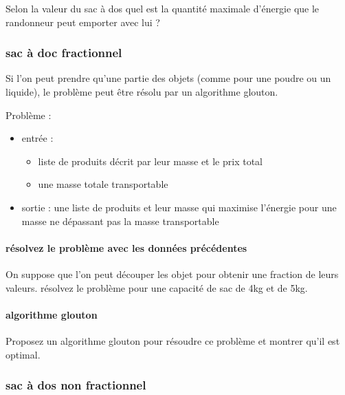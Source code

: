 \documentclass[
]{article}
\providecommand{\tightlist}{%
  \setlength{\itemsep}{0pt}\setlength{\parskip}{0pt}}
\begin{document}
Selon la valeur du sac à dos quel est la quantité maximale d'énergie que
le randonneur peut emporter avec lui ?

\hypertarget{sac-uxe0-doc-fractionnel}{%
\subsubsection{sac à doc fractionnel}\label{sac-uxe0-doc-fractionnel}}

Si l'on peut prendre qu'une partie des objets (comme pour une poudre ou
un liquide), le problème peut être résolu par un algorithme glouton.

Problème :

\begin{itemize}
\tightlist
\item
  entrée :

  \begin{itemize}
  \tightlist
  \item
    liste de produits décrit par leur masse et le prix total
  \item
    une masse totale transportable
  \end{itemize}
\item
  sortie : une liste de produits et leur masse qui maximise l'énergie
  pour une masse ne dépassant pas la masse transportable
\end{itemize}

\hypertarget{ruxe9solvez-le-probluxe8me-avec-les-donnuxe9es-pruxe9cuxe9dentes}{%
\paragraph{résolvez le problème avec les données
précédentes}\label{ruxe9solvez-le-probluxe8me-avec-les-donnuxe9es-pruxe9cuxe9dentes}}

On suppose que l'on peut découper les objet pour obtenir une fraction de
leurs valeurs. résolvez le problème pour une capacité de sac de 4kg et
de 5kg.

\hypertarget{algorithme-glouton-1}{%
\paragraph{algorithme glouton}\label{algorithme-glouton-1}}

Proposez un algorithme glouton pour résoudre ce problème et montrer
qu'il est optimal.

\hypertarget{sac-uxe0-dos-non-fractionnel}{%
\subsubsection{sac à dos non
fractionnel}\label{sac-uxe0-dos-non-fractionnel}}
\end{document}

